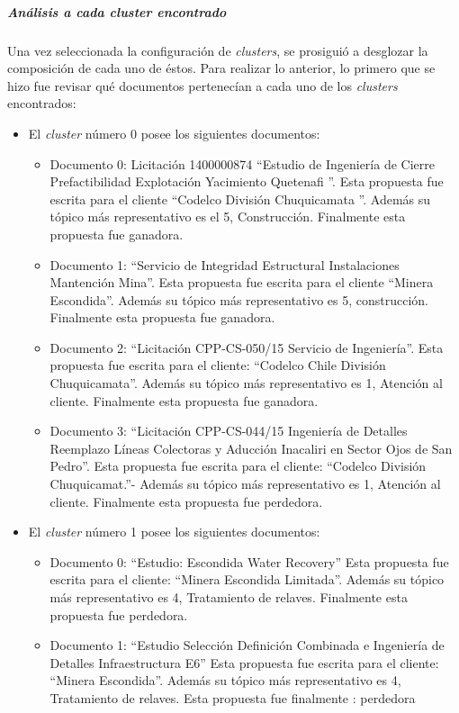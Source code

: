 \subparagraph{Análisis a cada cluster encontrado}
\subparagraph*{}
    Una vez seleccionada la configuración de \textit{clusters}, se prosiguió a desglozar la composición de cada uno de éstos. Para realizar lo anterior, lo primero que se hizo fue revisar qué documentos pertenecían a cada uno de los \textit{clusters} encontrados:
    
    \begin{itemize}
        \item El \textit{cluster} número 0 posee los siguientes documentos:
    \begin{itemize}
        \item Documento 0: Licitación 1400000874 ``Estudio de Ingeniería de Cierre Prefactibilidad Explotación Yacimiento Quetenaﬁ ''.
        Esta propuesta fue escrita para el cliente ``Codelco División Chuquicamata ''. Además su tópico más representativo es el 5, Construcción. Finalmente esta propuesta fue ganadora.
        
        \item Documento 1:  ``Servicio de Integridad Estructural Instalaciones Mantención Mina''.
        Esta propuesta fue escrita para el cliente ``Minera Escondida''. Además su tópico más representativo es 5, construcción. Finalmente esta propuesta fue ganadora.
        
        \item Documento 2: ``Licitación CPP-CS-050/15 Servicio de Ingeniería''. Esta propuesta fue escrita para el cliente: ``Codelco Chile División Chuquicamata''. Además su tópico más representativo es 1, Atención al cliente. Finalmente esta propuesta fue ganadora.
        
        \item Documento 3: ``Licitación CPP-CS-044/15 Ingeniería de Detalles Reemplazo Líneas Colectoras y Aducción Inacaliri en Sector Ojos de San Pedro''.
        Esta propuesta fue escrita para el cliente: ``Codelco División Chuquicamat.''- 
        Además su tópico más representativo es 1, Atención al cliente. Finalmente esta propuesta fue perdedora.
    \end{itemize}
    \item El \textit{cluster} número 1 posee los siguientes documentos:
        \begin{itemize}
            \item Documento 0: ``Estudio: Escondida Water Recovery''
            Esta propuesta fue escrita para el cliente: ``Minera Escondida Limitada''. Además su tópico más representativo es 4, Tratamiento de relaves.
            Finalmente esta propuesta fue perdedora.            
            \item Documento 1: ``Estudio Selección Definición Combinada e Ingeniería de Detalles Infraestructura E6''
            Esta propuesta fue escrita para el cliente: ``Minera Escondida''. Además su tópico más representativo es 4, Tratamiento de relaves.
            Esta propuesta fue finalmente : perdedora


\end{itemize}
\end{itemize}
